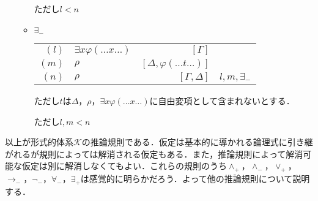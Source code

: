 \documentclass[10pt,b5paper,papersize,dvipdfmx]{jsbook}
\begin{document}
\begin{itemize}
\begin{itemize}
\begin{table}[H]
\begin{center}
\begin{tabular}{rlrl}
\end{tabular}
\end{center}
\end{table}
ただし$l<n$
\item $\exists_-$
\begin{table}[H]
\begin{center}
\begin{tabular}{rlrl}
$(l)$&$\exists x\varphi(\dots x \dots)$&$[\Gamma]$& \\
$(m)$&$\rho$&$[\Delta,\varphi(\dots t \dots)]$& \\
$(n)$&$\rho$&$[\Gamma,\Delta]$&$l,m,\exists_-$
\end{tabular}
\end{center}
\end{table}
ただし$t$は$\Delta$，$\rho$，$\exists x\varphi(\dots x \dots)$に自由変項として含まれないとする． \par
ただし$l,m<n$
\end{itemize}
\end{itemize}
以上が形式的体系$\mathcal K$の推論規則である．仮定は基本的に導かれる論理式に引き継がれるが規則によっては解消される仮定もある．また，推論規則によって解消可能な仮定は別に解消しなくてもよい．これらの規則のうち$\land_+$，$\land_-$，$\lor_+$，$\to_-$，$\lnot_-$，$\forall_-$，$\exists_+$は感覚的に明らかだろう．よって他の推論規則について説明する．
\end{document}
